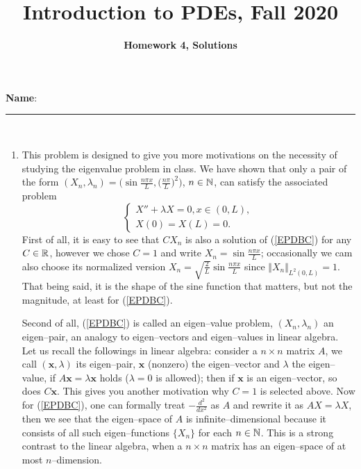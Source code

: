 \documentclass[6pt]{article}
\title{Introduction to PDEs, Fall 2020}
\author{\textbf{Homework 4, Solutions}}
\date{}
\numberwithin{equation}{section}
\def\mathbb{\Bbb}
\begin{document}
\maketitle

\textbf{Name}:\rule{1 in}{0.001 in} \\
\begin{enumerate}
\item This problem is designed to give you more motivations on the necessity of studying the eigenvalue problem in class.  We have shown that only a pair of the form $(X_n,\lambda_n)=\big(\sin \frac{n\pi x}{L}, \big(\frac{n\pi }{L}\big)^2\big)$, $n\in\mathbb N$, can satisfy the associated problem
\begin{equation}\label{EPDBC}
\left\{
\begin{array}{ll}
X''+\lambda X=0, x\in (0,L),\\
X(0)=X(L)=0.
\end{array}
\right.
\end{equation}
First of all, it is easy to see that $CX_n$ is also a solution of (\ref{EPDBC}) for any $C\in\mathbb R$, however we chose $C=1$ and write $X_n=\sin \frac{n\pi x}{L}$; occasionally we cam also choose its normalized version $X_n=\sqrt{\frac{2}{L}}\sin \frac{n\pi x}{L}$ since $\Vert X_n\Vert_{L^2(0,L)}=1$.  That being said, it is the shape of the sine function that matters, but not the magnitude, at least for (\ref{EPDBC}).

Second of all, (\ref{EPDBC}) is called an eigen--value problem, $(X_n,\lambda_n)$ an eigen--pair, an analogy to eigen--vectors and eigen--values in linear algebra.  Let us recall the followings in linear algebra: consider a $n\times n$ matrix $A$, we call $(\textbf{x},\lambda)$ its eigen--pair, $\textbf{x}$ (nonzero) the eigen--vector and $\lambda$ the eigen--value, if $A\textbf{x}=\lambda \textbf{x}$ holds ($\lambda=0$ is allowed); then if $\textbf{x}$ is an eigen--vector, so does $C\textbf{x}$.  This gives you another motivation why $C=1$ is selected above.  Now for (\ref{EPDBC}), one can formally treat $-\frac{d^2}{dx^2}$ as $A$ and rewrite it as $AX=\lambda X$, then we see that the eigen--space of $A$ is infinite--dimensional because it consists of all such eigen--functions $\{X_n\}$ for each $n\in\mathbb N$.  This is a strong contrast to the linear algebra, when a $n\times n$ matrix has an eigen--space of at most $n$--dimension.


\end{enumerate}
\end{document}
